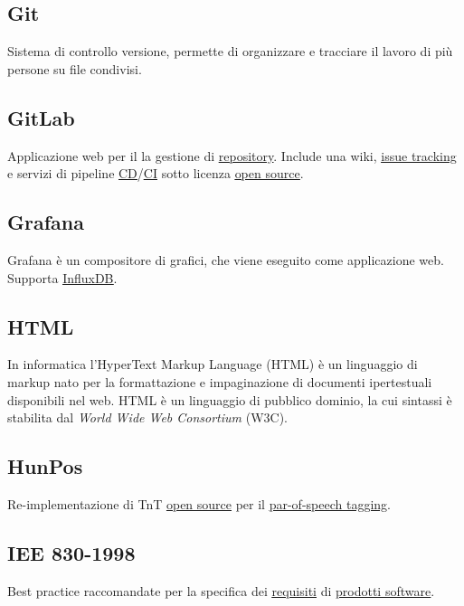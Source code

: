 	\subsection{Git}
	\label{sec:git}
	Sistema di controllo versione, permette di organizzare e tracciare il lavoro di più persone su file condivisi.

	\subsection{GitLab}
	\label{sec:git}
	Applicazione web per il la gestione di \underline{\hyperref[sec:repo]{repository}}. Include una wiki, \underline{\hyperref[sec:issuetrack]{issue tracking}} e servizi di pipeline \underline{\hyperref[sec:continuousdelivery]{CD}}/\underline{\hyperref[sec:continuousintegration]{CI}} sotto licenza \underline{\hyperref[sec:opensource]{open source}}.

	\subsection{Grafana}
	\label{sec:grafana}
	Grafana è un compositore di grafici, che viene eseguito come applicazione web. Supporta \underline{\hyperref[sec:influxdb]{InfluxDB}}.


	\subsection{HTML}
	\label{sec:html}
	In informatica l'HyperText Markup Language (HTML) è un linguaggio di markup  nato per la formattazione e impaginazione di documenti ipertestuali disponibili nel web. HTML è un linguaggio di pubblico dominio, la cui sintassi è stabilita dal \emph{World Wide Web Consortium} (W3C).

	\subsection{HunPos}
	\label{sec:hunpos}
	Re-implementazione di TnT \underline{\hyperref[sec:opensource]{open source}} per il \underline{\hyperref[sec:post]{par-of-speech tagging}}.

	\newpage



	\subsection{IEE 830-1998}
	\label{sec:iee830}
	Best practice raccomandate per la specifica dei \underline{\hyperref[sec:requisito]{requisiti}} di \underline{\hyperref[sec:prodottosoftware]{prodotti software}}.

